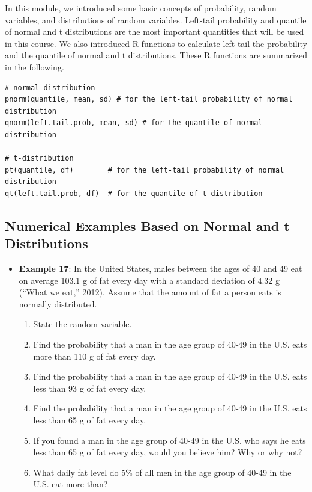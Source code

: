 \documentclass[
]{book}
\providecommand{\tightlist}{%
  \setlength{\itemsep}{0pt}\setlength{\parskip}{0pt}}
\begin{document}
In this module, we introduced some basic concepts of probability, random variables, and distributions of random variables. Left-tail probability and quantile of normal and t distributions are the most important quantities that will be used in this course. We also introduced R functions to calculate left-tail the probability and the quantile of normal and t distributions. These R functions are summarized in the following.

\begin{verbatim}
# normal distribution
pnorm(quantile, mean, sd) # for the left-tail probability of normal distribution
qnorm(left.tail.prob, mean, sd) # for the quantile of normal distribution

# t-distribution
pt(quantile, df)        # for the left-tail probability of normal distribution
qt(left.tail.prob, df)  # for the quantile of t distribution
\end{verbatim}

\hypertarget{numerical-examples-based-on-normal-and-t-distributions}{%
\subsection{Numerical Examples Based on Normal and t Distributions}\label{numerical-examples-based-on-normal-and-t-distributions}}

\begin{itemize}
\item
  \textbf{Example 17}: In the United States, males between the ages of 40 and 49 eat on average 103.1 g of fat every day with a standard deviation of 4.32 g (``What we eat,'' 2012). Assume that the amount of fat a person eats is normally distributed.

  \begin{enumerate}
  \def\labelenumi{\arabic{enumi}.}
  \tightlist
  \item
    State the random variable.
  \item
    Find the probability that a man in the age group of 40-49 in the U.S. eats more than 110 g of fat every day.
  \item
    Find the probability that a man in the age group of 40-49 in the U.S. eats less than 93 g of fat every day.
  \item
    Find the probability that a man in the age group of 40-49 in the U.S. eats less than 65 g of fat every day.
  \item
    If you found a man in the age group of 40-49 in the U.S. who says he eats less than 65 g of fat every day, would you believe him? Why or why not?
  \item
    What daily fat level do 5\% of all men in the age group of 40-49 in the U.S. eat more than?
  \end{enumerate}
\end{itemize}
\end{document}
